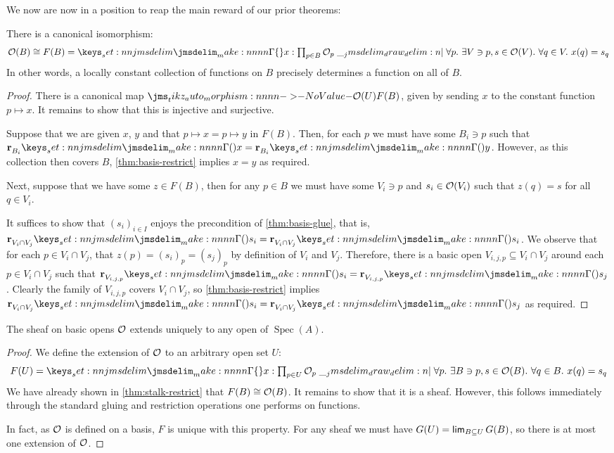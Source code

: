 \documentclass{amsart}
\DeclareMathOperator{\Spec}{Spec}
\begin{document}
We now are now in a position to reap the main reward of our prior theorems:
\begin{theorem}
  \label{thm:stalk-restrict}
  There is a canonical isomorphism:
  \[
    \StructSh(B) \cong
    F(B) =
    \braces{
      x : \textstyle\prod_{p \in B} \StructSh_p \mathrel{\delimsep{|}}
      \forall p.\ \exists V \ni p, s \in \StructSh(V).\ \forall q \in V.\ x(q) = s_q
    }
  \]
  In other words, a locally constant collection of functions on $B$ precisely determines a function
  on all of $B$.
\end{theorem}
\begin{proof}
  There is a canonical map $\Mor{\StructSh(U)}{F(B)}$, given by sending $x$ to the constant
  function $p \mapsto x$. It remains to show that this is injective and surjective.

  Suppose that we are given $x$, $y$ and that $p \mapsto x = p \mapsto y$ in $F(B)$. Then, for each
  $p$ we must have some $B_i \ni p$ such that $\Res{x}{B_i} = \Res{y}{B_i}$. However, as this
  collection then covers $B$, \cref{thm:basis-restrict} implies $x = y$ as required.

  Next, suppose that we have some $z \in F(B)$, then for any $p \in B$ we must have some $V_i \ni p$
  and $s_i \in \mathcal{O}(V_i)$ such that $z(q) = s$ for all $q \in V_i$.

  It suffices to show that $(s_i)_{i \in I}$ enjoys the precondition of \cref{thm:basis-glue}, that
  is, $\Res{s_i}{V_i \cap V_j} = \Res{s_i}{V_i \cap V_j}$. We observe that for each
  $p \in V_i \cap V_j$, that $z(p) = (s_i)_p = (s_j)_p$ by definition of $V_i$ and $V_j$. Therefore,
  there is a basic open $V_{i,j,p} \subseteq V_i \cap V_j$ around each $p \in V_i \cap V_j$ such
  that $\Res{s_i}{V_{i,j,p}} = \Res{s_j}{V_{i,j,p}}$. Clearly the family of $V_{i,j,p}$ covers
  $V_i \cap V_j$, so \cref{thm:basis-restrict} implies
  $\Res{s_i}{V_i \cap V_j} = \Res{s_j}{V_i \cap V_j}$ as required.
\end{proof}

\begin{theorem}
  The sheaf on basic opens $\mathcal{O}$ extends uniquely to any open of $\Spec(A)$.
\end{theorem}
\begin{proof}
  We define the extension of $\mathcal{O}$ to an arbitrary open set $U$:
  \[
    F(U) = \braces{
      x : \textstyle\prod_{p \in U} \StructSh_p \mathrel{\delimsep{|}}
      \forall p.\ \exists B \ni p, s \in \StructSh(B).\ \forall q \in B.\ x(q) = s_q
    }
  \]
  We have already shown in \cref{thm:stalk-restrict} that $F(B) \cong \mathcal{O}(B)$. It remains to
  show that it is a sheaf. However, this follows immediately through the standard gluing and
  restriction operations one performs on functions.

  In fact, as $\mathcal{O}$ is defined on a basis, $F$ is unique with this property. For any sheaf we
  must have $G(U) = \mathop{\mathsf{lim}}_{B \subseteq U} G(B)$, so there is at most one extension of $\mathcal{O}$.
\end{proof}

\printbibliography
\end{document}
